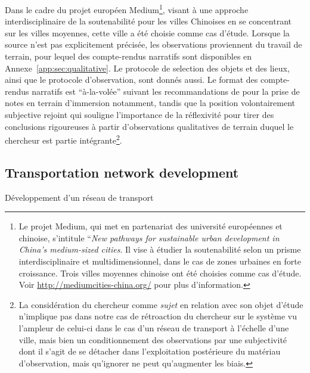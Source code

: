 Dans le cadre du projet européen Medium\footnote{Le projet Medium, qui met en partenariat des université européennes et chinoise, s'intitule ``\textit{New pathways for sustainable urban development in China’s medium-sized cities}. Il vise à étudier la soutenabilité selon un prisme interdisciplinaire et multidimensionnel, dans le cas de zones urbaines en forte croissance. Trois villes moyennes chinoise ont été choisies comme cas d'étude. Voir \url{http://mediumcities-china.org/} pour plus d'information.}, visant à une approche interdisciplinaire de la soutenabilité pour les villes Chinoises en se concentrant sur les villes moyennes, cette ville a été choisie comme cas d'étude. Lorsque la source n'est pas explicitement précisée, les observations proviennent du travail de terrain, pour lequel des compte-rendus narratifs sont disponibles en Annexe~\ref{app:sec:qualitative}. Le protocole de selection des objets et des lieux, ainsi que le protocole d'observation, sont donnés aussi. Le format des compte-rendus narratifs est ``à-la-volée'' suivant les recommandations de \cite{goffman1989fieldwork} pour la prise de notes en terrain d'immersion notamment, tandis que la position volontairement subjective rejoint \cite{ball1990self} qui souligne l'importance de la réflexivité pour tirer des conclusions rigoureuses à partir d'observations qualitatives de terrain duquel le chercheur est partie intégrante\footnote{La considération du chercheur comme \emph{sujet} en relation avec son objet d'étude n'implique pas dans notre cas de rétroaction du chercheur sur le système vu l'ampleur de celui-ci dans le cas d'un réseau de transport à l'échelle d'une ville, mais bien un conditionnement des observations par une subjectivité dont il s'agit de se détacher dans l'exploitation postérieure du matériau d'observation, mais qu'ignorer ne peut qu'augmenter les biais.}.







\subsection{Transportation network development}{Développement d'un réseau de transport}



